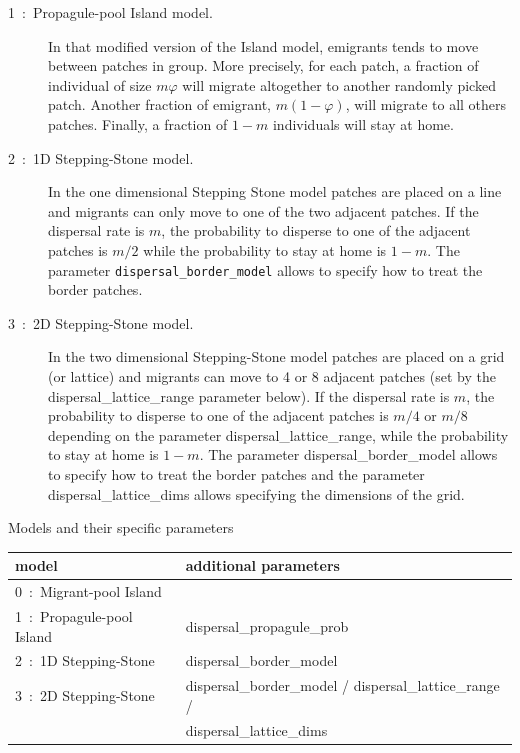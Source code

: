 \documentclass[letterpaper,12pt,oneside]{book}
\begin{document}
\begin{description}
\begin{description}
\item[1~:~Propagule-pool Island model.] In that modified version of the Island model, emigrants tends to move between patches in group. More precisely, for each patch, a fraction of individual of size $m\varphi$ will migrate altogether to another randomly picked patch. Another fraction of emigrant,  $m(1-\varphi)$,  will migrate to all others patches. Finally,  a fraction of $1-m$ individuals will stay at home.

\item[2~:~1D Stepping-Stone model.] In the one dimensional Stepping Stone model patches are placed on a line and migrants can only move to one of the two adjacent patches. If the dispersal rate is $m$, the probability to disperse to one of the adjacent patches is $m/2$ while the probability to stay at home is $1-m$. The parameter \texttt{dispersal\_border\_model} allows to specify how to treat the border patches.   

\item[3~:~2D Stepping-Stone model.] In the two dimensional Stepping-Stone model patches are placed on a grid (or lattice) and migrants can move to 4 or 8 adjacent patches (set by the \textsf{dispersal\_lattice\_range} parameter below). If the dispersal rate is $m$, the probability to disperse to one of the adjacent patches is $m/4$ or $m/8$ depending on the parameter \textsf{dispersal\_lattice\_range}, while the probability to stay at home is $1-m$. The parameter \textsf{dispersal\_border\_model} allows to specify how to treat the border patches and the parameter \textsf{dispersal\_lattice\_dims} allows specifying the dimensions of the grid.   

\end{description}

Models and their specific parameters\\
\begin{tabular}{ll}
 \hline model & additional parameters \\ 
 \hline
 0~:~Migrant-pool Island    & \\
 1~:~Propagule-pool Island  & dispersal\_propagule\_prob\\
 2~:~1D Stepping-Stone      & dispersal\_border\_model\\
 3~:~2D Stepping-Stone      & dispersal\_border\_model / dispersal\_lattice\_range / \\
                            & dispersal\_lattice\_dims\\
 \hline
\end{tabular}



\end{description}
\end{document}
